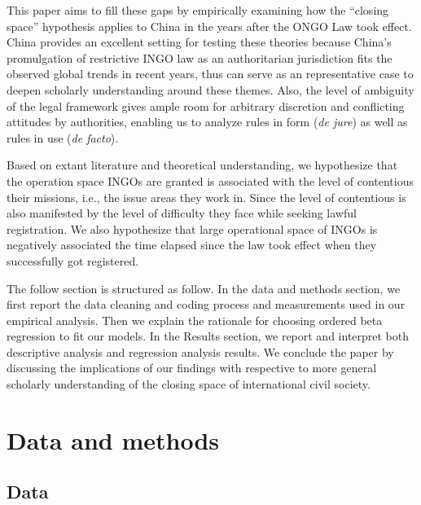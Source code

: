 \documentclass[
]{article}
\begin{document}
This paper aims to fill these gaps by empirically examining how the
``closing space'' hypothesis applies to China in the years after the
ONGO Law took effect. China provides an excellent setting for testing
these theories because China's promulgation of restrictive INGO law as
an authoritarian jurisdiction fits the observed global trends in recent
years, thus can serve as an representative case to deepen scholarly
understanding around these themes. Also, the level of ambiguity of the
legal framework gives ample room for arbitrary discretion and
conflicting attitudes by authorities, enabling us to analyze rules in
form (\emph{de jure}) as well as rules in use (\emph{de facto}).

Based on extant literature and theoretical understanding, we hypothesize
that the operation space INGOs are granted is associated with the level
of contentious their missions, i.e., the issue areas they work in. Since
the level of contentious is also manifested by the level of difficulty
they face while seeking lawful registration. We also hypothesize that
large operational space of INGOs is negatively associated the time
elapsed since the law took effect when they successfully got registered.

The follow section is structured as follow. In the data and methods
section, we first report the data cleaning and coding process and
measurements used in our empirical analysis. Then we explain the
rationale for choosing ordered beta regression to fit our models. In the
Results section, we report and interpret both descriptive analysis and
regression analysis results. We conclude the paper by discussing the
implications of our findings with respective to more general scholarly
understanding of the closing space of international civil society.

\hypertarget{data-and-methods}{%
\section{Data and methods}\label{data-and-methods}}

\hypertarget{data}{%
\subsection{Data}\label{data}}
\end{document}
